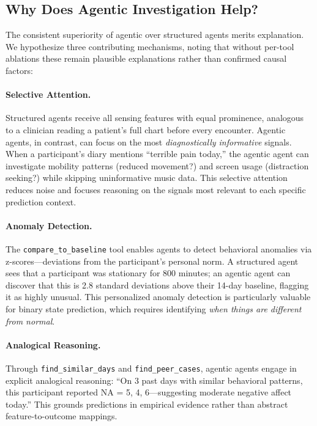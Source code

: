 \documentclass[screen,review,anonymous]{acmart}
\begin{document}
\subsection{Why Does Agentic Investigation Help?}

The consistent superiority of agentic over structured agents merits explanation. We hypothesize three contributing mechanisms, noting that without per-tool ablations these remain plausible explanations rather than confirmed causal factors:

\paragraph{Selective Attention.}
Structured agents receive all sensing features with equal prominence, analogous to a clinician reading a patient's full chart before every encounter. Agentic agents, in contrast, can focus on the most \emph{diagnostically informative} signals. When a participant's diary mentions ``terrible pain today,'' the agentic agent can investigate mobility patterns (reduced movement?) and screen usage (distraction seeking?) while skipping uninformative music data. This selective attention reduces noise and focuses reasoning on the signals most relevant to each specific prediction context.

\paragraph{Anomaly Detection.}
The \texttt{compare\_to\_baseline} tool enables agents to detect behavioral anomalies via z-scores---deviations from the participant's personal norm. A structured agent sees that a participant was stationary for 800 minutes; an agentic agent can discover that this is 2.8 standard deviations above their 14-day baseline, flagging it as highly unusual. This personalized anomaly detection is particularly valuable for binary state prediction, which requires identifying \emph{when things are different from normal}.

\paragraph{Analogical Reasoning.}
Through \texttt{find\_similar\_days} and \texttt{find\_peer\_cases}, agentic agents engage in explicit analogical reasoning: ``On 3 past days with similar behavioral patterns, this participant reported NA = 5, 4, 6---suggesting moderate negative affect today.'' This grounds predictions in empirical evidence rather than abstract feature-to-outcome mappings.
\end{document}
